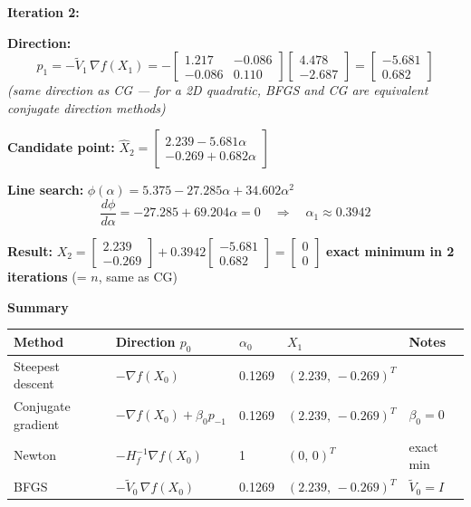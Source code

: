 \documentclass[11pt,a4paper]{article}
\newcommand{\sectionbox}[1]{%
  \begin{mdframed}[backgroundcolor=headbg, linewidth=0pt,
    innertopmargin=4pt, innerbottommargin=4pt,
    innerleftmargin=8pt, innerrightmargin=8pt]
    \large\bfseries\color{white}#1
  \end{mdframed}\vspace{4pt}
}
\newenvironment{methodbox}[1]{%
  \begin{mdframed}[backgroundcolor=#1, linewidth=0.5pt,
    innertopmargin=6pt, innerbottommargin=6pt,
    innerleftmargin=10pt, innerrightmargin=10pt]
}{%
  \end{mdframed}\vspace{4pt}
}
\begin{document}
\begin{methodbox}{sdbg}
\bigskip
\textbf{Iteration 2:}

\medskip
\textbf{Direction:}
\[
  \boxed{p_1 = -\tilde{V}_1\,\nabla f(X_1)}
  = -\begin{bmatrix}1.217 & -0.086\\-0.086 & 0.110\end{bmatrix}\begin{bmatrix}4.478\\-2.687\end{bmatrix}
  = \begin{bmatrix}-5.681\\0.682\end{bmatrix}
\]
\textit{(same direction as CG --- for a 2D quadratic, BFGS and CG are equivalent conjugate direction methods)}

\medskip
\textbf{Candidate point:}\quad
$\hat{X}_2 = \begin{bmatrix}2.239 - 5.681\alpha\\-0.269 + 0.682\alpha\end{bmatrix}$

\medskip
\textbf{Line search:}\quad
$\phi(\alpha) = 5.375 - 27.285\alpha + 34.602\alpha^2$
\[
  \frac{d\phi}{d\alpha} = -27.285 + 69.204\alpha = 0
  \quad\Rightarrow\quad \alpha_1 \approx 0.3942
\]

\textbf{Result:}\quad
$X_2 = \begin{bmatrix}2.239\\-0.269\end{bmatrix} + 0.3942\begin{bmatrix}-5.681\\0.682\end{bmatrix}
      = \begin{bmatrix}0\\0\end{bmatrix}$
\quad\textbf{exact minimum in 2 iterations} (= $n$, same as CG)
\end{methodbox}

\vspace{4pt}
\sectionbox{Summary}

\begin{tabular}{@{}lllll@{}}
\toprule
Method & Direction $p_0$ & $\alpha_0$ & $X_1$ & Notes \\
\midrule
Steepest descent & $-\nabla f(X_0)$ & 0.1269 & $(2.239,\,-0.269)^T$ & \\
Conjugate gradient & $-\nabla f(X_0)+\beta_0 p_{-1}$ & 0.1269 & $(2.239,\,-0.269)^T$ & $\beta_0=0$ \\
Newton & $-H_f^{-1}\nabla f(X_0)$ & 1 & $(0,\,0)^T$ & exact min \\
BFGS & $-\tilde{V}_0\,\nabla f(X_0)$ & 0.1269 & $(2.239,\,-0.269)^T$ & $\tilde{V}_0=I$ \\
\bottomrule
\end{tabular}
\end{document}
